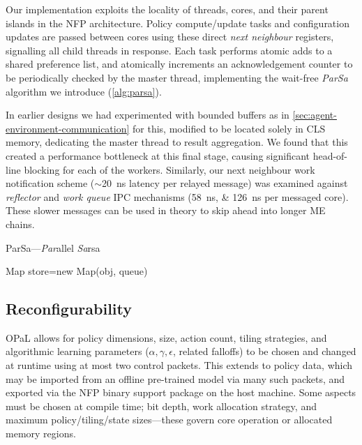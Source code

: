 \documentclass[sigconf,natbib=false]{acmart}
\newcommand{\approachshort}{OPaL}
\begin{document}
Our implementation exploits the locality of threads, cores, and their parent islands in the NFP architecture.
Policy compute/update tasks and configuration updates are passed between cores using these direct \emph{next neighbour} registers, signalling all child threads in response.
Each task performs atomic adds to a shared preference list, and atomically increments an acknowledgement counter to be periodically checked by the master thread, implementing the wait-free \emph{ParSa} algorithm we introduce (\cref{alg:parsa}).

In earlier designs we had experimented with bounded buffers as in \cref{sec:agent-environment-communication} for this, modified to be located solely in CLS memory, dedicating the master thread to result aggregation.
We found that this created a performance bottleneck at this final stage, causing significant head-of-line blocking for each of the workers.
Similarly, our next neighbour work notification scheme ($\sim$\SI{20}{\nano\second} latency per relayed message) was examined against \emph{reflector} and \emph{work queue} IPC mechanisms (\SIlist{58;126}{\nano\second} per messaged core).
These slower messages can be used in theory to skip ahead into longer ME chains.


\begin{algorithm}
	\caption{ParSa---\emph{Par}allel \emph{Sa}rsa\label{alg:parsa}}
	
	Map store=new Map(obj, queue)\;
\end{algorithm}

\subsection{Reconfigurability}
\approachshort{} allows for policy dimensions, size, action count, tiling strategies, and algorithmic learning parameters ($\alpha, \gamma, \epsilon$, related falloffs) to be chosen and changed at runtime using at most two control packets.
This extends to policy data, which may be imported from an offline pre-trained model via many such packets, and exported via the NFP binary support package on the host machine.
Some aspects must be chosen at compile time; bit depth, work allocation strategy, and maximum policy/tiling/state sizes---these govern core operation or allocated memory regions.
\end{document}
